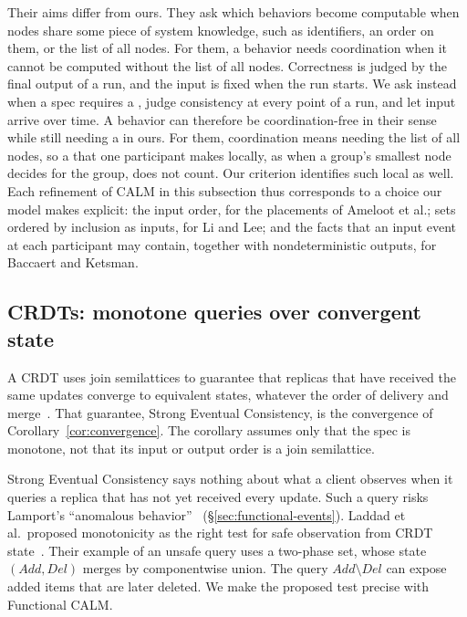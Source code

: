 Their aims differ from ours.  They ask which behaviors become computable when
nodes share some piece of system knowledge, such as identifiers, an order on
them, or the list of all nodes.  For them, a behavior needs coordination when
it cannot be computed without the list of all nodes.  Correctness is judged by
the final output of a run, and the input is fixed when the run starts.  We ask
instead when a spec requires a \commitment, judge consistency at every point of
a run, and let input arrive over time.  A behavior can therefore be
coordination-free in their sense while still needing a \commitment in ours.
For them, coordination means needing the list of all nodes, so a \commitment
that one participant makes locally, as when a group's smallest node decides
for the group, does not count.  Our criterion identifies such local
\commitments as well.  Each refinement of CALM in this subsection
thus corresponds to a choice our model makes explicit: the input order, for the
placements of Ameloot et al.; sets ordered by inclusion as inputs, for Li and
Lee; and the facts that an input event at each participant may contain,
together with nondeterministic outputs, for Baccaert and Ketsman.

\subsection{CRDTs: monotone queries over convergent state}
\label{sec:crdt-instance}

A CRDT uses join semilattices to guarantee that replicas that have received the
same updates converge to equivalent states, whatever the order of delivery and
merge~\cite{shapiro2011crdt}.  That guarantee, Strong Eventual Consistency, is
the convergence of Corollary~\ref{cor:convergence}.  The corollary assumes only
that the spec is monotone, not that its input or output order is a join
semilattice.

Strong Eventual Consistency says nothing about what a client observes when it
queries a replica that has not yet received every update.  Such a query risks
Lamport's ``anomalous behavior''~\cite{lamport1978time}
(\S\ref{sec:functional-events}).  Laddad et al.\ proposed monotonicity as the
right test for safe observation from CRDT state~\cite{laddad2022keep}.  Their
example of an unsafe query uses a two-phase set, whose state
$(\mathit{Add},\mathit{Del})$ merges by componentwise union.  The query
$\mathit{Add}\setminus\mathit{Del}$ can expose added items that are later
deleted.  We make the proposed test precise with Functional CALM.

